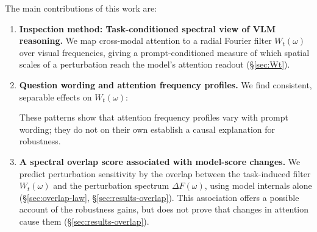 \documentclass[10pt,twocolumn,letterpaper]{article}
\newcommand{\Csem}{C_{\mathrm{sem}}}
\newcommand{\Wt}{W_t(\omega)}
\newcommand{\DF}{\Delta F(\omega)}
\begin{document}
%
The main contributions of this work are:

\begin{enumerate}[leftmargin=*,itemsep=1pt,topsep=2pt,parsep=0pt]
    \item \textbf{Inspection method: Task-conditioned spectral view of VLM reasoning.}
    We map cross-modal attention to a radial Fourier filter $\Wt$ over visual frequencies, giving a prompt-conditioned measure of which spatial scales of a perturbation reach the model's attention readout (\S\ref{sec:Wt}).

    \item \textbf{Question wording and attention frequency profiles.}
    We find consistent, separable effects on $\Wt$:  These patterns show that attention frequency profiles vary with prompt wording; they do not on their own establish a causal explanation for robustness.

    \item \textbf{A spectral overlap score associated with model-score changes.}
    We predict perturbation sensitivity by the overlap between the task-induced filter $\Wt$ and the perturbation spectrum $\DF$, using model internals alone %
    (\S\ref{sec:overlap-law}, \S\ref{sec:results-overlap}).
    This association offers a possible account of the robustness gains, but does not prove that changes in attention cause them (\S\ref{sec:results-overlap}).


\end{enumerate}
\end{document}
